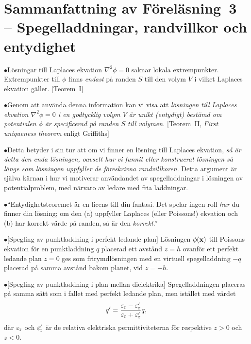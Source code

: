 {\section{Sammanfattning av F{\"o}rel{\"a}sning~3 -- Spegelladdningar,
  randvillkor och entydighet}
\item{$\bullet$}{L{\"o}sningar till Laplaces ekvation $\nabla^2\phi=0$
  saknar lokala extrempunkter. Extrempunkter till $\phi$ finns {\it endast}
  p{\aa} randen $S$ till den volym $V$ i vilket Laplaces ekvation g{\"a}ller.
  [Teorem~I]}
\item{$\bullet$}{Genom att anv{\"a}nda denna information kan vi visa
  att {\it l{\"o}sningen till Laplaces ekvation $\nabla^2\phi=0$ i en
  godtycklig volym $V$ {\"a}r unikt (entydigt) best{\"a}md om potentialen
  $\phi$ {\"a}r specificerad p{\aa} randen $S$ till volymen.}
  [Teorem~II, {\it First uniqueness theorem} enligt Griffiths]}
\item{$\bullet$}{Detta betyder i sin tur att om vi finner en l{\"o}sning
  till Laplaces ekvation, {\it s{\aa} {\"a}r detta den enda l{\"o}sningen,
  oavsett hur vi funnit eller konstruerat l{\"o}sningen s{\aa} l{\"a}nge
  som l{\"o}sningen uppfyller de f{\"o}reskrivna randvillkoren}.
  Detta argument {\"a}r sj{\"a}lva k{\"a}rnan i hur vi motiverar
  anv{\"a}ndandet av spegelladdningar i l{\"o}sningen av potentialproblem,
  med n{\"a}rvaro av ledare med fria laddningar.}
\item{$\bullet$}{``Entydighetsteoremet {\"a}r en licens till din fantasi.
  Det spelar ingen roll {\it hur} du finner din l{\"o}sning; om den
  (a) uppfyller Laplaces (eller Poissons!) ekvation och (b) har korrekt
  v{\"a}rde p{\aa} randen, s{\aa} {\"a}r den {\it korrekt}.''}
\item{$\bullet$}{[Spegling av punktladdning i perfekt ledande plan]
  L{\"o}sningen $\phi({\bf x})$ till Poissons ekvation f{\"o}r en punktladdning
  $q$ placerad ett avst{\aa}nd $z=h$ ovanf{\"o}r ett perfekt ledande plan $z=0$
  ges som frirymdl{\"o}sningen med en virtuell spegelladdning $-q$ placerad
  p{\aa} samma avst{\aa}nd bakom planet, vid $z=-h$.}
\item{$\bullet$}{[Spegling av punktladdning i plan mellan dielektrika]
  Spegelladdningen placeras p{\aa} samma s{\"a}tt som i fallet med perfekt
  ledande plan, men ist{\"a}llet med v{\"a}rdet
  $$
    q'={{\varepsilon_{\rm r}-\varepsilon'_{\rm r}}
         \over{\varepsilon_{\rm r}+\varepsilon'_{\rm r}}}q,
  $$
  d{\"a}r $\varepsilon_{\rm r}$ och $\varepsilon'_{\rm r}$ {\"a}r de relativa
  elektriska permittiviteterna f{\"o}r respektive $z>0$ och $z<0$.}
}
